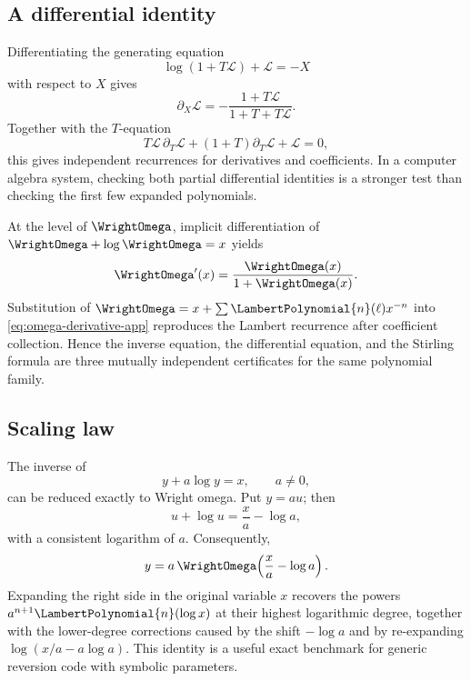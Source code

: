 \documentclass[11pt,oneside]{article}
\numberwithin{equation}{section}
\theoremstyle{definition}
\begin{document}
\subsection{A differential identity}

Differentiating the generating equation
\[
  \log(1+T\mathcal L)+\mathcal L=-X
\]
with respect to \(X\) gives
\begin{equation}\label{eq:Lambert-generating-X-derivative}
  \partial_X\mathcal L
  =-\frac{1+T\mathcal L}{1+T+T\mathcal L}.
\end{equation}
Together with the \(T\)-equation
\[
  T\mathcal L\,\partial_T\mathcal L
  +(1+T)\partial_T\mathcal L+\mathcal L=0,
\]
this gives independent recurrences for derivatives and coefficients.  In a
computer algebra system, checking both partial differential identities is a
stronger test than checking the first few expanded polynomials.

At the level of \(\WrightOmega\), implicit differentiation of
\(\WrightOmega+\log\WrightOmega=x\) yields
\begin{equation}\label{eq:omega-derivative-app}
  \WrightOmega'(x)=\frac{\WrightOmega(x)}{1+\WrightOmega(x)}.
\end{equation}
Substitution of \(\WrightOmega=x+\sum \LambertPolynomial{n}(\ell)x^{-n}\) into
\eqref{eq:omega-derivative-app} reproduces the Lambert recurrence after
coefficient collection.  Hence the inverse equation, the differential equation,
and the Stirling formula are three mutually independent certificates for the
same polynomial family.

\subsection{Scaling law}

The inverse of
\begin{equation}\label{eq:scaled-Lambert-map}
  y+a\log y=x,
  \qquad a\ne0,
\end{equation}
can be reduced exactly to Wright omega.  Put \(y=a u\); then
\[
  u+\log u=\frac{x}{a}-\log a,
\]
with a consistent logarithm of \(a\).  Consequently,
\begin{equation}\label{eq:scaled-omega-exact}
  y=a\,\WrightOmega\!\left(\frac{x}{a}-\log a\right).
\end{equation}
Expanding the right side in the original variable \(x\) recovers the powers
\(a^{n+1}\LambertPolynomial{n}(\log x)\) at their highest logarithmic degree, together with the
lower-degree corrections caused by the shift \(-\log a\) and by re-expanding
\(\log(x/a-a\log a)\).  This identity is a useful exact benchmark for generic
reversion code with symbolic parameters.
\end{document}
